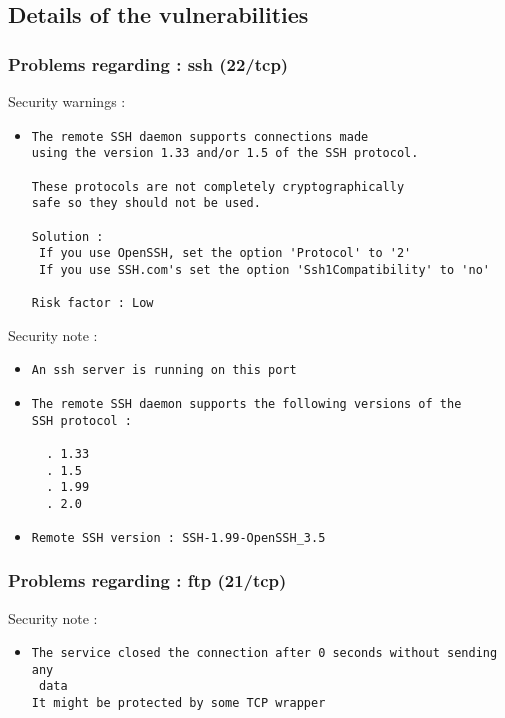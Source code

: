 \documentclass{article}
\begin{document}
\subsection{Details of the vulnerabilities}
\subsubsection{Problems regarding : ssh (22/tcp)}
Security warnings :\\
\begin{itemize}
\item \begin{verbatim}
The remote SSH daemon supports connections made
using the version 1.33 and/or 1.5 of the SSH protocol.

These protocols are not completely cryptographically
safe so they should not be used.

Solution : 
 If you use OpenSSH, set the option 'Protocol' to '2'
 If you use SSH.com's set the option 'Ssh1Compatibility' to 'no'
  
Risk factor : Low
\end{verbatim}\end{itemize}
Security note :\\
\begin{itemize}
\item \begin{verbatim}
An ssh server is running on this port
\end{verbatim}\item \begin{verbatim}
The remote SSH daemon supports the following versions of the
SSH protocol :

  . 1.33
  . 1.5
  . 1.99
  . 2.0

\end{verbatim}\item \begin{verbatim}
Remote SSH version : SSH-1.99-OpenSSH_3.5
\end{verbatim}\end{itemize}
\subsubsection{Problems regarding : ftp (21/tcp)}
Security note :\\
\begin{itemize}
\item \begin{verbatim}
The service closed the connection after 0 seconds without sending any
 data
It might be protected by some TCP wrapper

\end{verbatim}\end{itemize}
\end{document}
